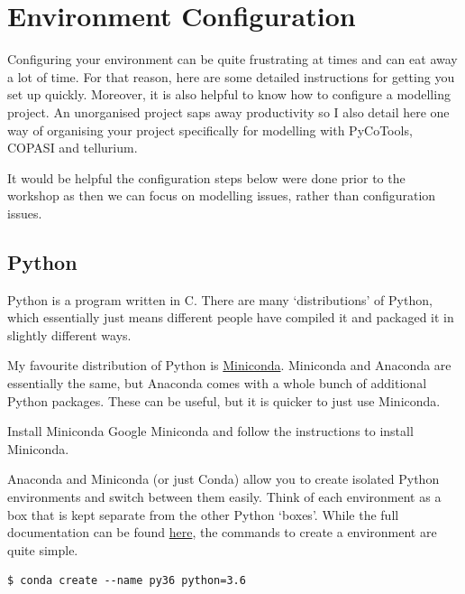 \documentclass[../main]{subfiles}
\begin{document}
\section{Environment Configuration}
Configuring your environment can be quite frustrating at times and can eat away a lot of time. For that reason,
here are some detailed instructions for getting you set up quickly. Moreover, it is also helpful to know how to configure a
modelling project. An unorganised project saps away productivity so I also detail here one way of organising your
project specifically for modelling with PyCoTools, COPASI and tellurium.

It would be helpful the configuration steps below were done prior to the workshop
as then we can focus on modelling issues, rather than configuration issues.

\subsection{Python}
Python is a program written in C. There are many `distributions' of Python, which essentially just means
different people have compiled it and packaged it in slightly different ways.

My favourite distribution of Python is \href{https://docs.conda.io/en/latest/miniconda.html}{Miniconda}. Miniconda
and Anaconda are essentially the same, but Anaconda comes with a whole bunch of additional Python packages. These
can be useful, but it is quicker to just use Miniconda.

\begin{Task}[label=InstallMiniconda]{Install Miniconda}
Google Miniconda and follow the instructions to install Miniconda.
\end{Task}


Anaconda and Miniconda (or just Conda) allow you to create isolated Python environments
and switch between them easily. Think of each  environment as a box that is
kept separate from the other Python `boxes'. While the full documentation can be
found \href{https://docs.conda.io/projects/conda/en/latest/user-guide/tasks/manage-environments.html}{here},
the commands to create a  environment are quite simple.

\begin{verbatim}
$ conda create --name py36 python=3.6
\end{verbatim}
\end{document}
